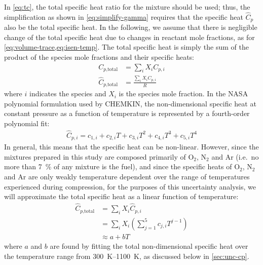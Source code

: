 \documentclass[../main.tex]{subfiles}
\begin{document}
In \cref{eq:tc}, the total specific heat ratio for the mixture
should be used; thus, the simplification as shown in \cref{eq:simplify-gamma}
requires that the specific heat $\hat{C}_p$ also be the total specific
heat. In the following, we assume that there is negligible
change of the total specific heat due to changes in reactant
mole fractions, as for \cref{eq:volume-trace,eq:isen-temp}.
The total specific heat is simply the sum of the product of
the species mole fractions and their specific heats:
%
\begin{subequations}
\label{eq:cp}
\begin{align}
C_{p\text{,total}} &= \sum_i X_i C_{p,i} \\
\hat{C}_{p\text{,total}} &= \frac{\sum_i X_i C_{p,i}}{R}
\end{align}
\end{subequations}
%
where $i$ indicates the species and $X_i$ is the species mole fraction.
In the NASA polynomial formulation used by CHEMKIN, the non-dimensional specific
heat at constant pressure as a function of temperature is represented by a
fourth-order polynomial fit:
%
\begin{align}
\label{eq:cp-nasa}
\hat{C}_{p,i} = c_{1,i} + c_{2,i} T + c_{3,i} T^2 + c_{4,i} T^3 + c_{5,i} T^4
\end{align}
%
In general, this means that the specific heat can be non-linear. However,
since the mixtures prepared in this study are composed primarily of
O$_2$, N$_2$ and Ar (i.e.\ no more than \SI{7}{\percent} of any mixture is the
fuel), and since the specific heats of O$_2$, N$_2$ and Ar are only weakly
temperature dependent over the range of temperatures experienced during
compression, for the purposes of this uncertainty analysis, we will
approximate the total specific heat as a linear function of temperature:
%
\begin{equation}
\label{eq:cp-total}
\begin{split}
\hat{C}_{p\text{,total}} &= \sum_i X_i \hat{C}_{p,i} \\
&= \sum_i X_i \left( \sum_{j=1}^5 c_{j,i} T^{j-1} \right) \\
&\approx a + b T
\end{split}
\end{equation}
%
where $a$ and $b$ are found by fitting the total non-dimensional specific heat
over the temperature range from \SIrange{300}{1100}{\kelvin}, as
discussed below in \cref{sec:unc-cp}.
\end{document}
